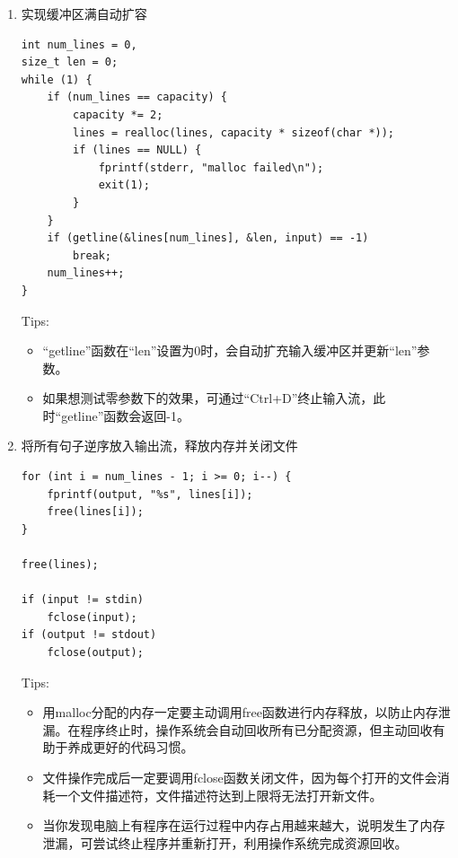 \documentclass[fontset=ubuntu]{ctexart}
\begin{document}
\begin{enumerate}
          \begin{lstlisting}
// 记录行数和初始容量
int capacity = 10;
char **lines = malloc(capacity * sizeof(char *));
if (lines == NULL) {
    fprintf(stderr, "malloc failed\n");
    exit(1);
}
          \end{lstlisting}
    \item 实现缓冲区满自动扩容
          \begin{lstlisting}
int num_lines = 0, 
size_t len = 0;
while (1) {
    if (num_lines == capacity) {
        capacity *= 2;
        lines = realloc(lines, capacity * sizeof(char *));
        if (lines == NULL) {
            fprintf(stderr, "malloc failed\n");
            exit(1);
        }
    }
    if (getline(&lines[num_lines], &len, input) == -1)
        break;
    num_lines++;
}
          \end{lstlisting}
          \noindent Tips:
          \vspace{-0.3cm}
          \begin{itemize}
              \item “getline”函数在“len”设置为0时，会自动扩充输入缓冲区并更新“len”参数。
              \item 如果想测试零参数下的效果，可通过“Ctrl+D”终止输入流，此时“getline”函数会返回-1。
          \end{itemize}
    \item 将所有句子逆序放入输出流，释放内存并关闭文件
          \begin{lstlisting}
for (int i = num_lines - 1; i >= 0; i--) {
    fprintf(output, "%s", lines[i]);
    free(lines[i]);
}

free(lines);

if (input != stdin)
    fclose(input);
if (output != stdout)
    fclose(output);
    \end{lstlisting}
          \noindent Tips:
          \vspace{-0.3cm}
          \begin{itemize}
              \item 用malloc分配的内存一定要主动调用free函数进行内存释放，以防止内存泄漏。在程序终止时，操作系统会自动回收所有已分配资源，但主动回收有助于养成更好的代码习惯。
              \item 文件操作完成后一定要调用fclose函数关闭文件，因为每个打开的文件会消耗一个文件描述符，文件描述符达到上限将无法打开新文件。
              \item 当你发现电脑上有程序在运行过程中内存占用越来越大，说明发生了内存泄漏，可尝试终止程序并重新打开，利用操作系统完成资源回收。
          \end{itemize}
\end{enumerate}
\end{document}

